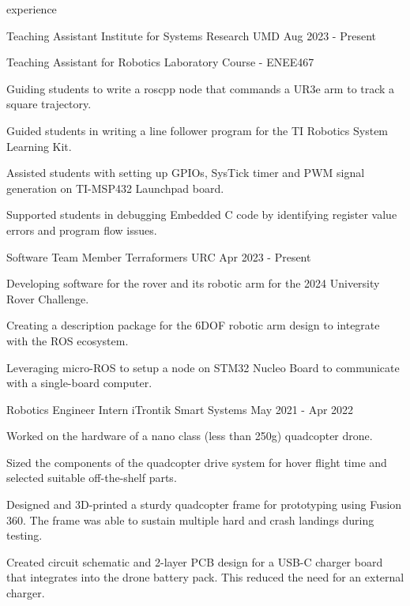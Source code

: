 \begin{section}{experience}

  \begin{work}
    {Teaching Assistant}
    {Institute for Systems Research}
    {UMD}
    {Aug 2023 - Present}

    \item Teaching Assistant for Robotics Laboratory Course - ENEE467
    \item Guiding students to write a roscpp node that commands a UR3e arm to track a square trajectory. 
    \item Guided students in writing a line follower program for the TI Robotics System Learning Kit.
    \item Assisted students with setting up GPIOs, SysTick timer and PWM signal generation on TI-MSP432 Launchpad board.
    \item Supported students in debugging Embedded C code by identifying register value errors and program flow issues.

  \end{work}

  \begin{work}
    {Software Team Member}
    {Terraformers URC}
    {}
    {Apr 2023 - Present}

    \item Developing software for the rover and its robotic arm for the 2024 University Rover Challenge.
    \item Creating a description package for the 6DOF robotic arm design to integrate with the ROS ecosystem.
    \item Leveraging micro-ROS to setup a node on STM32 Nucleo Board to communicate with a single-board computer.
  
  \end{work}

  \begin{work}
    {Robotics Engineer Intern}
    {iTrontik Smart Systems}
    {}
    {May 2021 - Apr 2022}

    \item Worked on the hardware of a nano class (less than 250g) quadcopter drone.
    \item Sized the components of the quadcopter drive system for hover flight time and selected suitable off-the-shelf parts. 
    \item Designed and 3D-printed a sturdy quadcopter frame for prototyping using Fusion 360. 
          The frame was able to sustain multiple hard and crash landings during testing.
    \item Created circuit schematic and 2-layer PCB design for a USB-C charger board that integrates into
          the drone battery pack. This reduced the need for an external charger.
  
  \end{work}

\end{section}